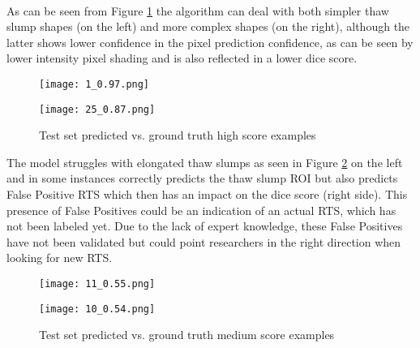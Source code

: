 \paragraph{}
As can be seen from Figure \ref{high_score_pic} the algorithm can deal with both simpler thaw slump shapes (on the left) and more complex shapes (on the right), although the latter shows lower confidence in the pixel prediction confidence, as can be seen by lower intensity pixel shading and is also reflected in a lower dice score.

    \begin{figure}[hbt!]
        \begin{minipage}[c]{0.55\linewidth}
        \texttt{[image: 1\_0.97.png]}
        \label{best_dice}
        \end{minipage}
            \hfill
            \begin{minipage}[c]{0.55\linewidth}
            \texttt{[image: 25\_0.87.png]}
            \label{high_score_pic}
        \end{minipage}
        \caption{Test set predicted vs. ground truth high score examples}
    \end{figure}

The model struggles with elongated thaw slumps as seen in Figure \ref{medium_score_pic} on the left and in some instances correctly predicts the thaw slump \gls{ROI} but also predicts False Positive \gls{RTS} which then has an impact on the dice score (right side). This presence of False Positives could be an indication of an actual \gls{RTS}, which has not been labeled yet. Due to the lack of expert knowledge, these False Positives have not been validated but could point researchers in the right direction when looking for new \gls{RTS}.

    \begin{figure}[hbt!]
        \begin{minipage}[c]{0.55\linewidth}
        \texttt{[image: 11\_0.55.png]}
        \label{best_dice}
        \end{minipage}
            \hfill
            \begin{minipage}[c]{0.55\linewidth}
            \texttt{[image: 10\_0.54.png]}
            \label{medium_score_pic}
        \end{minipage}
        \caption{Test set predicted vs. ground truth medium score examples}
    \end{figure}

